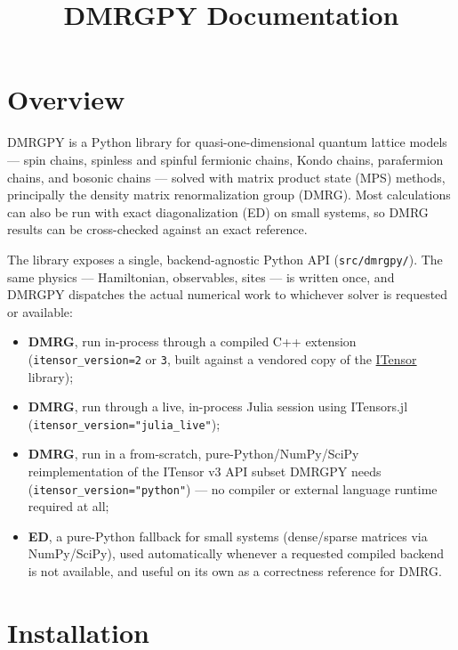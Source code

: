 \documentclass[11pt]{article}
\title{DMRGPY Documentation}
\author{}
\date{}
\begin{document}
\maketitle
\tableofcontents

\section{Overview}
\label{sec:intro}

DMRGPY is a Python library for quasi-one-dimensional quantum lattice
models --- spin chains, spinless and spinful fermionic chains, Kondo
chains, parafermion chains, and bosonic chains --- solved with matrix
product state (MPS) methods, principally the density matrix
renormalization group (DMRG). Most calculations can also be run with
exact diagonalization (ED) on small systems, so DMRG results can be
cross-checked against an exact reference.

The library exposes a single, backend-agnostic Python API
(\texttt{src/dmrgpy/}). The same physics --- Hamiltonian, observables,
sites --- is written once, and DMRGPY dispatches the actual numerical
work to whichever solver is requested or available:

\begin{itemize}
  \item \textbf{DMRG}, run in-process through a compiled C++ extension
    (\texttt{itensor\_version=2} or \texttt{3}, built against a vendored
    copy of the \href{https://itensor.org/}{ITensor} library);
  \item \textbf{DMRG}, run through a live, in-process Julia session using
    ITensors.jl (\texttt{itensor\_version="julia\_live"});
  \item \textbf{DMRG}, run in a from-scratch, pure-Python/NumPy/SciPy
    reimplementation of the ITensor v3 API subset DMRGPY needs
    (\texttt{itensor\_version="python"}) --- no compiler or external
    language runtime required at all;
  \item \textbf{ED}, a pure-Python fallback for small systems
    (dense/sparse matrices via NumPy/SciPy), used automatically whenever
    a requested compiled backend is not available, and useful on its own
    as a correctness reference for DMRG.
\end{itemize}

\section{Installation}
\label{sec:install}
\end{document}
